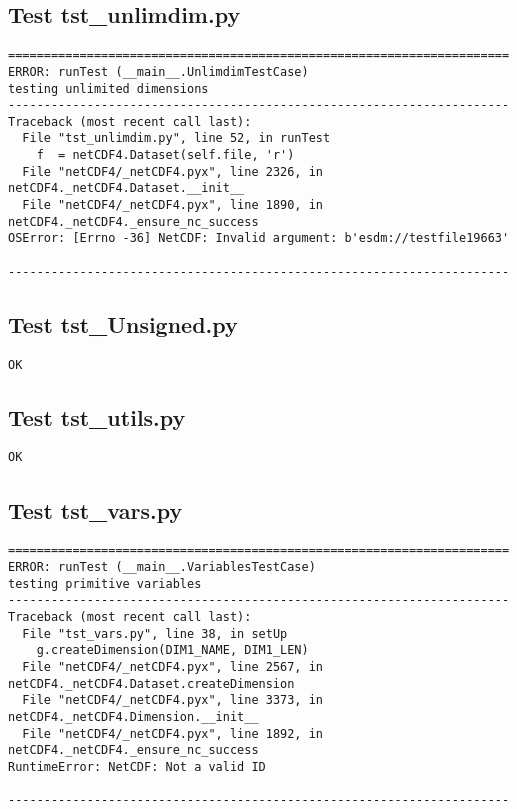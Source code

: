 \subsection{Test tst\_unlimdim.py}

\begin{verbatim}
======================================================================
ERROR: runTest (__main__.UnlimdimTestCase)
testing unlimited dimensions
----------------------------------------------------------------------
Traceback (most recent call last):
  File "tst_unlimdim.py", line 52, in runTest
    f  = netCDF4.Dataset(self.file, 'r')
  File "netCDF4/_netCDF4.pyx", line 2326, in netCDF4._netCDF4.Dataset.__init__
  File "netCDF4/_netCDF4.pyx", line 1890, in netCDF4._netCDF4._ensure_nc_success
OSError: [Errno -36] NetCDF: Invalid argument: b'esdm://testfile19663'

----------------------------------------------------------------------
\end{verbatim}

\subsection{Test tst\_Unsigned.py}

\begin{verbatim}
OK
\end{verbatim}

\subsection{Test tst\_utils.py}

\begin{verbatim}
OK
\end{verbatim}

\subsection{Test tst\_vars.py}

\begin{verbatim}
======================================================================
ERROR: runTest (__main__.VariablesTestCase)
testing primitive variables
----------------------------------------------------------------------
Traceback (most recent call last):
  File "tst_vars.py", line 38, in setUp
    g.createDimension(DIM1_NAME, DIM1_LEN)
  File "netCDF4/_netCDF4.pyx", line 2567, in netCDF4._netCDF4.Dataset.createDimension
  File "netCDF4/_netCDF4.pyx", line 3373, in netCDF4._netCDF4.Dimension.__init__
  File "netCDF4/_netCDF4.pyx", line 1892, in netCDF4._netCDF4._ensure_nc_success
RuntimeError: NetCDF: Not a valid ID

----------------------------------------------------------------------
\end{verbatim}


